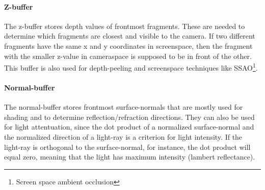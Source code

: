 \documentclass{ACGSeminar}
\begin{document}
		\paragraph{Z-buffer}
			The z-buffer stores depth values of frontmost fragments. These are needed to determine which fragments are closest and visible to the camera. If two different fragments have the same x and y coordinates in screenspace, then the fragment with the smaller z-value in cameraspace is supposed to be in front of the other. This buffer is also used for depth-peeling and screenspace techniques like SSAO\footnote{Screen space ambient occlusion}. 
		\paragraph{Normal-buffer}
			The normal-buffer stores frontmost surface-normals that are mostly used for shading and to determine reflection/refraction directions. They can also be used for light attentuation, since the dot product of a normalized surface-normal and the normalized direction of a light-ray is a criterion for light intensity. If the light-ray is orthogonal to the surface-normal, for instance, the dot product will equal zero, meaning that the light has maximum intensity (lambert reflectance).
\end{document}
